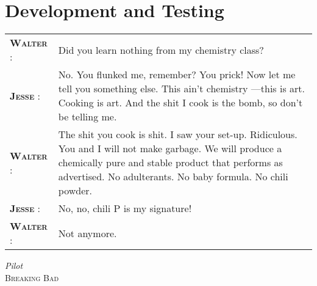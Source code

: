 \chapter{Development and Testing} %
\label{cha:development_and_testing}

\setlength{\epigraphwidth}{10cm}
\renewcommand{\tabcolsep}{0em}

\epigraph{
  \begin{tabular}{p{1.75cm}p{8cm}}
    \footnotesize{\textbf{\textsc{Walter}} :}
      & Did you learn nothing from my chemistry class? \\
    \footnotesize{\textbf{\textsc{Jesse}} :}
      & No. You flunked me, remember? You prick! Now let me tell you something else. This ain't chemistry ---this is art. Cooking is art. And the shit I cook is the bomb, so don't be telling me. \\
    \footnotesize{\textbf{\textsc{Walter}} :}
      & The shit you cook is shit. I saw your set-up. Ridiculous. You and I will not make garbage. We will produce a chemically pure and stable product that performs as advertised. No adulterants. No baby formula. No chili powder. \\
    \footnotesize{\textbf{\textsc{Jesse}} :}
      & No, no, chili P is my signature! \\
    \footnotesize{\textbf{\textsc{Walter}} :}
      & Not anymore. \\
  \end{tabular}
  \vspace{1em}
}{\textit{Pilot}\\ \textsc{Breaking Bad}}

\newpage


\nicesectionending

\nicesectionending

\nicesectionending

\nicesectionending

\nicesectionending

\nicesectionending

\nicesectionending

\nicesectionending

\nicechapterending
